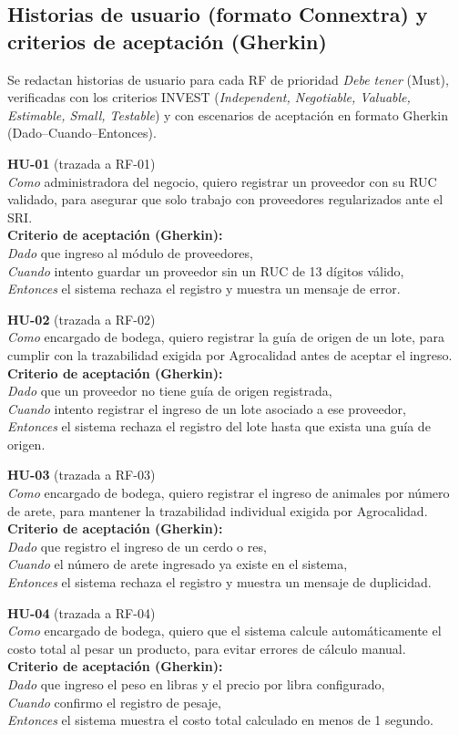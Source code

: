 \documentclass[11pt,a4paper]{article}
\begin{document}
\subsection{Historias de usuario (formato Connextra) y criterios de aceptación (Gherkin)}
Se redactan historias de usuario para cada RF de prioridad \textit{Debe tener} (Must), verificadas con los criterios INVEST (\textit{Independent, Negotiable, Valuable, Estimable, Small, Testable}) \cite{swebok2024} y con escenarios de aceptación en formato Gherkin (Dado--Cuando--Entonces).

\newcommand{\huitem}[4]{%
\noindent\textbf{#1} (trazada a #2)\\
\textit{Como} #3\\[0.15cm]
\textbf{Criterio de aceptación (Gherkin):}\\
#4
\vspace{0.3cm}
}

\huitem{HU-01}{RF-01}{administradora del negocio, quiero registrar un proveedor con su RUC validado, para asegurar que solo trabajo con proveedores regularizados ante el SRI.}{
\textit{Dado} que ingreso al módulo de proveedores,\\
\textit{Cuando} intento guardar un proveedor sin un RUC de 13 dígitos válido,\\
\textit{Entonces} el sistema rechaza el registro y muestra un mensaje de error.}

\huitem{HU-02}{RF-02}{encargado de bodega, quiero registrar la guía de origen de un lote, para cumplir con la trazabilidad exigida por Agrocalidad antes de aceptar el ingreso.}{
\textit{Dado} que un proveedor no tiene guía de origen registrada,\\
\textit{Cuando} intento registrar el ingreso de un lote asociado a ese proveedor,\\
\textit{Entonces} el sistema rechaza el registro del lote hasta que exista una guía de origen.}

\huitem{HU-03}{RF-03}{encargado de bodega, quiero registrar el ingreso de animales por número de arete, para mantener la trazabilidad individual exigida por Agrocalidad.}{
\textit{Dado} que registro el ingreso de un cerdo o res,\\
\textit{Cuando} el número de arete ingresado ya existe en el sistema,\\
\textit{Entonces} el sistema rechaza el registro y muestra un mensaje de duplicidad.}

\huitem{HU-04}{RF-04}{encargado de bodega, quiero que el sistema calcule automáticamente el costo total al pesar un producto, para evitar errores de cálculo manual.}{
\textit{Dado} que ingreso el peso en libras y el precio por libra configurado,\\
\textit{Cuando} confirmo el registro de pesaje,\\
\textit{Entonces} el sistema muestra el costo total calculado en menos de 1 segundo.}
\end{document}
